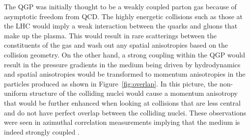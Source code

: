 
%
%
%
%
%
%

The QGP was initially thought to be a weakly coupled parton gas because of asymptotic freedom from QCD. The highly energetic collisions such as those at the LHC would imply a weak interaction between the quarks and gluons that make up the plasma. This would result in rare scatterings between the constituents of the gas and wash out any spatial anisotropies based on the collision geometry. On the other hand, a strong coupling within the QGP would result in the pressure gradients in the medium being driven by hydrodynamics and spatial anisotropies would be transformed to momentum anisotropies in the particles produced as shown in Figure~\ref{fig:overlap}. In this picture, the non-uniform structure of the colliding nuclei would cause a momentum anisotropy that would be further enhanced when looking at collisions that are less central and do not have perfect overlap between the colliding nuclei. These observations were seen in azimuthal correlation measurements implying that the medium is indeed strongly coupled \cite{Aaboud:2018ves, PhysRevLett.91.182301, Sirunyan:2017fts, PhysRevLett.116.132302}. 

